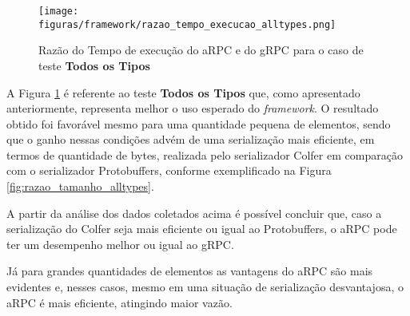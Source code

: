 \begin{figure}[ht]
    \centering
    \caption{Razão do Tempo de execução do aRPC e do gRPC para o caso de teste \textbf{Todos os Tipos}}
    \texttt{[image: figuras/framework/razao\_tempo\_execucao\_alltypes.png]}
    \label{fig:razao_tempo_execucao_alltypes}
\end{figure}

A Figura \ref{fig:razao_tempo_execucao_alltypes} é referente ao teste \textbf{Todos os Tipos} que, como apresentado anteriormente, representa melhor o uso esperado do \textit{framework}. O resultado obtido foi favorável mesmo para uma quantidade pequena de elementos, sendo que o ganho nessas condições advém de uma serialização mais eficiente, em termos de quantidade de bytes, realizada pelo serializador Colfer em comparação com o serializador Protobuffers, conforme exemplificado na Figura \ref{fig:razao_tamanho_alltypes}.

A partir da análise dos dados coletados acima é possível concluir que, caso a serialização do Colfer seja mais eficiente ou igual ao Protobuffers, o aRPC pode ter um desempenho melhor ou igual ao gRPC. 

Já para grandes quantidades de elementos as vantagens do aRPC são mais evidentes e, nesses casos, mesmo em uma situação de serialização desvantajosa, o aRPC é mais eficiente, atingindo maior vazão.